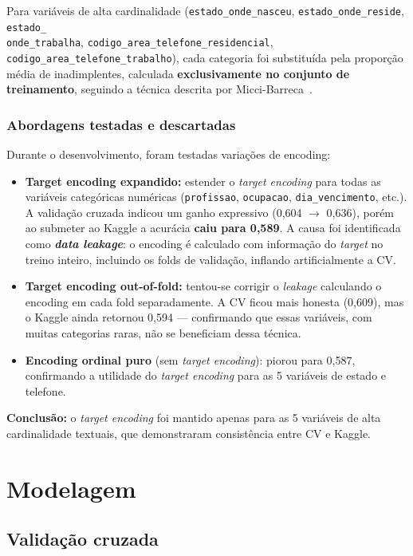 \documentclass[12pt, a4paper]{article}
\newcommand{\code}[1]{\texttt{#1}}
\begin{document}
Para variáveis de alta cardinalidade (\code{estado\_onde\_nasceu}, \code{estado\_onde\_reside}, \code{estado\_\\onde\_trabalha}, \code{codigo\_area\_telefone\_residencial}, \code{codigo\_area\_telefone\_trabalho}), cada categoria foi substituída pela proporção média de inadimplentes, calculada \textbf{exclusivamente no conjunto de treinamento}, seguindo a técnica descrita por Micci-Barreca~\cite{ref:micci}.

\subsubsection{Abordagens testadas e descartadas}

Durante o desenvolvimento, foram testadas variações de encoding:

\begin{itemize}[leftmargin=2em]
  \item \textbf{Target encoding expandido:} estender o \textit{target encoding} para todas as variáveis categóricas numéricas (\code{profissao}, \code{ocupacao}, \code{dia\_vencimento}, etc.). A validação cruzada indicou um ganho expressivo (0,604 $\to$ 0,636), porém ao submeter ao Kaggle a acurácia \textbf{caiu para 0,589}. A causa foi identificada como \textbf{\textit{data leakage}}: o encoding é calculado com informação do \textit{target} no treino inteiro, incluindo os folds de validação, inflando artificialmente a CV.
  \item \textbf{Target encoding out-of-fold:} tentou-se corrigir o \textit{leakage} calculando o encoding em cada fold separadamente. A CV ficou mais honesta (0,609), mas o Kaggle ainda retornou 0,594 --- confirmando que essas variáveis, com muitas categorias raras, não se beneficiam dessa técnica.
  \item \textbf{Encoding ordinal puro} (sem \textit{target encoding}): piorou para 0,587, confirmando a utilidade do \textit{target encoding} para as 5 variáveis de estado e telefone.
\end{itemize}

\textbf{Conclusão:} o \textit{target encoding} foi mantido apenas para as 5 variáveis de alta cardinalidade textuais, que demonstraram consistência entre CV e Kaggle.

\section{Modelagem}

\subsection{Validação cruzada}
\end{document}
